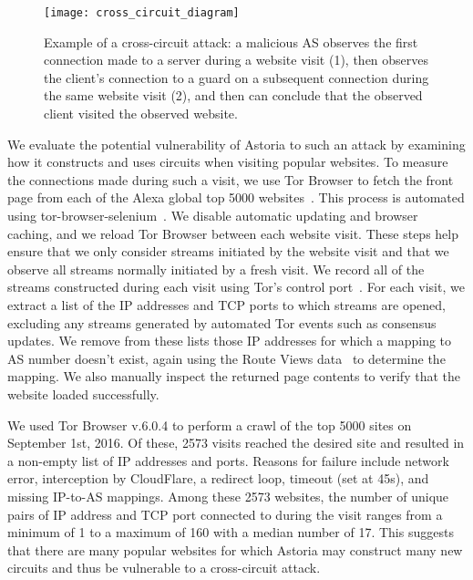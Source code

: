 \documentclass[conference]{styles/IEEEtran}
\begin{document}
\begin{figure}[ht]
\centering
\texttt{[image: cross\_circuit\_diagram]}
\vspace{-4mm}
\caption{\small Example of a cross-circuit attack: a malicious AS observes the first connection made to a server during a website visit (1), then observes the client's connection to a guard on a subsequent connection during the same website visit (2), and then can conclude that the observed client visited the observed website.}
\label{fig:cross_attack}
\vspace{-4mm}
\end{figure}

We evaluate the potential vulnerability of Astoria to such an attack by examining how it constructs
and uses circuits when visiting popular websites. To measure the connections made during
such a visit, we use Tor Browser to fetch the front page from each of the Alexa global top
5000 websites~\cite{alexa}. This process is automated using
tor-browser-selenium~\cite{tor-browser-selenium}. We disable automatic updating and browser
caching, and we reload Tor Browser between each website visit. These steps help ensure that we only
consider streams initiated by the website visit and that we observe all streams normally
initiated by a fresh visit. We record all of the streams constructed during each visit using Tor's
control port~\cite{tor-control-spec}. For each visit, we extract a list of the IP addresses and TCP
ports to which streams are opened, excluding any streams generated by automated Tor events such as
consensus updates. We remove from these lists those IP addresses for which a mapping to AS number
doesn't exist, again using the Route Views data~\cite{routeviews-prefix2as} to determine the
mapping. We also manually inspect the returned page contents to verify that the website loaded
successfully.

We used Tor Browser v.6.0.4 to perform a crawl of the top 5000 sites on September 1st, 2016.
Of these, 2573 visits reached the desired site and resulted in a non-empty list of IP addresses and
ports. Reasons for failure include network error, interception by CloudFlare, a
redirect loop, timeout (set at 45s), and missing IP-to-AS mappings. Among these 2573 websites, the
number of unique pairs of IP address and TCP port connected to during the visit ranges from a
minimum of 1 to a maximum of 160 with a median number of 17. This suggests that there are many
popular websites for which Astoria may construct many new circuits and thus be vulnerable to a
cross-circuit attack.
\end{document}
